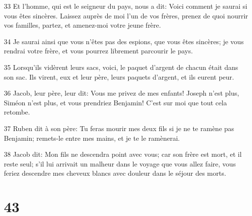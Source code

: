 \par 33 Et l'homme, qui est le seigneur du pays, nous a dit: Voici comment je saurai si vous êtes sincères. Laissez auprès de moi l'un de vos frères, prenez de quoi nourrir vos familles, partez, et amenez-moi votre jeune frère.
\par 34 Je saurai ainsi que vous n'êtes pas des espions, que vous êtes sincères; je vous rendrai votre frère, et vous pourrez librement parcourir le pays.
\par 35 Lorsqu'ils vidèrent leurs sacs, voici, le paquet d'argent de chacun était dans son sac. Ils virent, eux et leur père, leurs paquets d'argent, et ils eurent peur.
\par 36 Jacob, leur père, leur dit: Vous me privez de mes enfants! Joseph n'est plus, Siméon n'est plus, et vous prendriez Benjamin! C'est sur moi que tout cela retombe.
\par 37 Ruben dit à son père: Tu feras mourir mes deux fils si je ne te ramène pas Benjamin; remets-le entre mes mains, et je te le ramènerai.
\par 38 Jacob dit: Mon fils ne descendra point avec vous; car son frère est mort, et il reste seul; s'il lui arrivait un malheur dans le voyage que vous allez faire, vous feriez descendre mes cheveux blancs avec douleur dans le séjour des morts.

\chapter{43}

